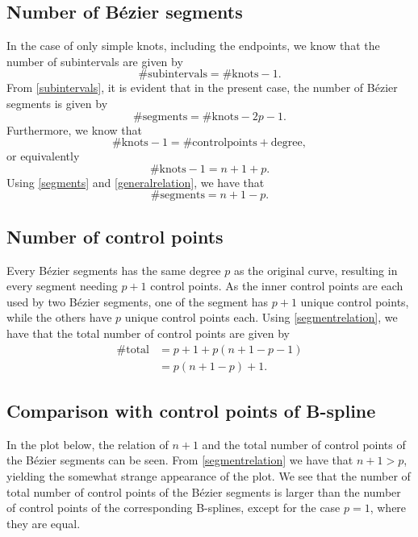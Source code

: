 \documentclass[]{article}
\begin{document}
\subsection*{Number of B\'{e}zier segments}
In the case of only simple knots, including the endpoints, we know that the number of subintervals are given by \begin{equation}\label{subintervals}
\#\mathrm{subintervals} = \#\mathrm{knots} - 1.
\end{equation}
From \eqref{subintervals}, it is evident that in the present case, the number of B\'{e}zier segments is given by \begin{equation}\label{segments}
\#\mathrm{segments} = \#\mathrm{knots} - 2p - 1.
\end{equation}
Furthermore, we know that \begin{equation*}
\#\mathrm{knots} - 1 = \#\mathrm{controlpoints} + \mathrm{degree},
\end{equation*} 
or equivalently\begin{equation}\label{generalrelation}
\#\mathrm{knots} - 1 = n + 1 + p.
\end{equation}
Using \eqref{segments} and \eqref{generalrelation}, we have that \begin{equation}\label{segmentrelation}
\#\mathrm{segments} = n + 1 - p.
\end{equation}
\subsection*{Number of control points}
Every B\'{e}zier segments has the same degree $p$ as the original curve, resulting in every segment needing $p+1$ control points. As the inner control points are each used by two B\'{e}zier segments, one of the segment has $p+1$ unique control points, while the others have $p$ unique control points each. Using \eqref{segmentrelation}, we have that the total number of control points are given by\begin{equation*}
\begin{aligned}
\#\mathrm{total} &= p + 1 + p(n + 1 - p - 1)\\
&= p(n + 1 - p) + 1.
\end{aligned}
\end{equation*}
\subsection*{Comparison with control points of B-spline}
In the plot below, the relation of $n+1$ and the total number of control points of the B\'{e}zier segments can be seen. From \eqref{segmentrelation} we have that $n+1>p$, yielding the somewhat strange appearance of the plot. We see that the number of total number of control points of the B\'{e}zier segments is larger than the number of control points of the corresponding B-splines, except for the case $p=1$, where they are equal.
\end{document}
